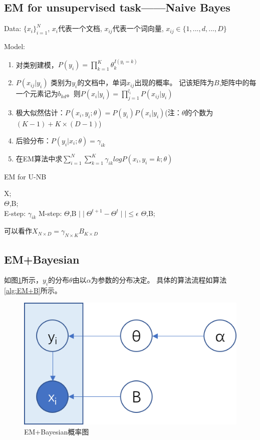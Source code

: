 \documentclass[UTF8]{ctexart}
\numberwithin{equation}{section}
\begin{document}
\subsection{ EM for unsupervised task——Naive Bayes}
Data: $\{x_i\}_{i=1}^N$, $x_i$代表一个文档, $x_{ij}$代表一个词向量,
$x_{ij}\in\{1,...,d,...,D\}$

Model: 
\begin{enumerate}
    \item 对类别建模，$P(y_i)=\prod_{k=1}^K\theta_k ^{I(y_i=k)}$
    \item $P(x_{ij}|y_i)$ 类别为$y_i$的文档中，单词$x_{ij}$出现的概率。
    记该矩阵为$B$,矩阵中的每一个元素记为$b_{kd}$。则$P(x_{i}|y_i)=\prod_{j=1}^{l_i}P(x_{ij}|y_i)$
    \item 极大似然估计：$P(x_i,y_i;\theta)=P(y_i)P(x_i|y_i)$(注：$\theta$的个数为$(K-1)+K\times(D-1)$)
    \item 后验分布：$P(y_i|x_i;\theta)=\gamma _{ik}$
    \item 在EM算法中求$\sum_{i=1}^N\sum_{k=1}^K\gamma_{ik}log P(x_i,y_i=k;\theta)$
\end{enumerate}
\begin{algorithm}[htb]
    \caption{EM for U-NB}
    \label{alg:EM-U-NB}
    \begin{algorithmic}[1]
    \REQUIRE
    X; \\
    \ENSURE 
    $\Theta$,B; \\
    \REPEAT 
    \STATE E-step: $\gamma_{ik}$
    \STATE M-step: $\Theta$,B
    \UNTIL $\mid\mid \Theta^{t+1} -\Theta^t \mid\mid \leq \epsilon$
    \RETURN $\Theta$,B;
    \end{algorithmic}
\end{algorithm}

可以看作$X_{N\times D}=\gamma_{N\times K}B_{K\times D}$

\subsection{EM+Bayesian}
如图\ref{fig:bay}所示，$y_i$的分布$\theta$由以$\alpha$为参数的分布决定。
具体的算法流程如算法\ref{alg:EM+B}所示。
\begin{figure}
    \centering
    \includegraphics{./figure/bayesian.png}
    \caption{EM+Bayesian概率图
    \label{fig:bay}}
\end{figure}
\end{document}
